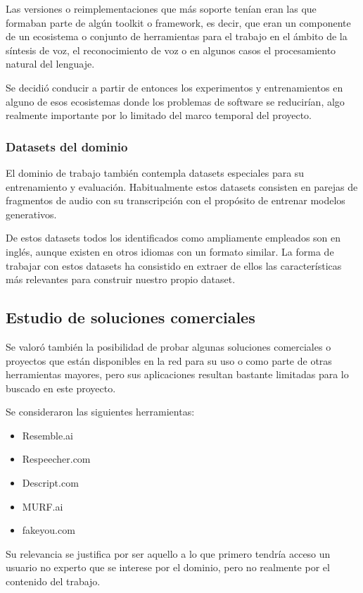 Las versiones o reimplementaciones que más soporte tenían eran las que formaban parte de algún toolkit o framework, es decir, que eran un componente de un ecosistema o conjunto de herramientas para el trabajo en el ámbito de la síntesis de voz, el reconocimiento de voz o en algunos casos el procesamiento natural del lenguaje.

Se decidió conducir a partir de entonces los experimentos y entrenamientos en alguno de esos ecosistemas donde los problemas de software se reducirían, algo realmente importante por lo limitado del marco temporal del proyecto.

\subsubsection{Datasets del dominio}

El dominio de trabajo también contempla datasets especiales para su entrenamiento y evaluación. Habitualmente estos datasets consisten en parejas de fragmentos de audio con su transcripción con el propósito de entrenar modelos generativos.

De estos datasets todos los identificados como ampliamente empleados son en inglés, aunque existen en otros idiomas con un formato similar. La forma de trabajar con estos datasets ha consistido en extraer de ellos las características más relevantes para construir nuestro propio dataset.

\subsection{Estudio de soluciones comerciales}

Se valoró también la posibilidad de probar algunas soluciones comerciales o proyectos que están disponibles en la red para su uso o como parte de otras herramientas mayores, pero sus aplicaciones resultan bastante limitadas para lo buscado en este proyecto.

Se consideraron las siguientes herramientas:

\begin{itemize}
    \item Resemble.ai
    \item Respeecher.com
    \item Descript.com
    \item MURF.ai
    \item fakeyou.com
\end{itemize}

Su relevancia se justifica por ser aquello a lo que primero tendría acceso un usuario no experto que se interese por el dominio, pero no realmente por el contenido del trabajo.

